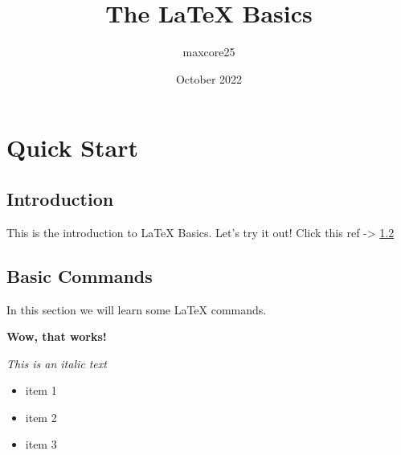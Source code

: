 \documentclass[a4paper,14pt]{report}
\title{The LaTeX Basics}
\author{maxcore25}
\date{October 2022}
\begin{document}
\maketitle

\tableofcontents{}
\clearpage

\chapter{Quick Start}

\section{Introduction}
This is the introduction to LaTeX Basics. Let's try it out! Click this ref -> \ref{example}

\section{Basic Commands}
\label{example}
In this section we will learn some LaTeX commands.

\textbf{Wow, that works!}

\textit{This is an italic text}

\begin{itemize}
    \item item 1
    \item item 2
    \item item 3
\end{itemize}
\end{document}
